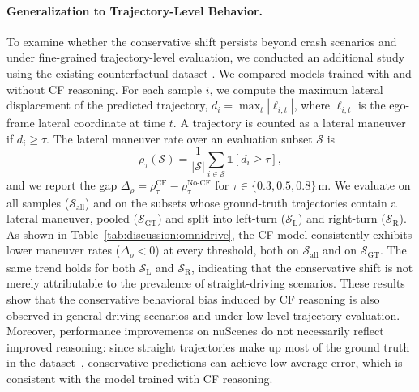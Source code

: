 \documentclass{article}
\begin{document}
\paragraph{Generalization to Trajectory-Level Behavior.} To examine whether the conservative shift persists beyond crash scenarios and under fine-grained trajectory-level evaluation, we conducted an additional study using the existing counterfactual dataset \cite{causal:e2e-vlm:omnidrive}. We compared models trained with and without CF reasoning. For each sample $i$, we compute the maximum lateral displacement of the predicted trajectory, $d_i=\max_t |\ell_{i,t}|$, where $\ell_{i,t}$ is the ego-frame lateral coordinate at time $t$. A trajectory is counted as a lateral maneuver if $d_i \ge \tau$. The lateral maneuver rate over an evaluation subset $\mathcal{S}$ is
\begin{equation}
\rho_\tau(\mathcal{S}) = \frac{1}{|\mathcal{S}|}\sum_{i\in\mathcal{S}} \mathbb{1}\!\left[d_i \ge \tau\right],
\end{equation}
and we report the gap $\Delta_\rho=\rho_\tau^{\text{CF}}-\rho_\tau^{\text{No-CF}}$ for $\tau\in\{0.3, 0.5, 0.8\}$\,m. We evaluate on all samples ($\mathcal{S}_{\text{all}}$) and on the subsets whose ground-truth trajectories contain a lateral maneuver, pooled ($\mathcal{S}_{\text{GT}}$) and split into left-turn ($\mathcal{S}_{\text{L}}$) and right-turn ($\mathcal{S}_{\text{R}}$). As shown in Table~\ref{tab:discussion:omnidrive}, the CF model consistently exhibits lower maneuver rates ($\Delta_\rho<0$) at every threshold, both on $\mathcal{S}_{\text{all}}$ and on $\mathcal{S}_{\text{GT}}$. The same trend holds for both $\mathcal{S}_{\text{L}}$ and $\mathcal{S}_{\text{R}}$, indicating that the conservative shift is not merely attributable to the prevalence of straight-driving scenarios. These results show that the conservative behavioral bias induced by CF reasoning is also observed in general driving scenarios and under low-level trajectory evaluation. Moreover, performance improvements on nuScenes do not necessarily reflect improved reasoning: since straight trajectories make up most of the ground truth in the dataset~\cite{causal:e2e:ad-mlp,ad:unitraj}, conservative predictions can achieve low average error, which is consistent with the model trained with CF reasoning.
\end{document}
